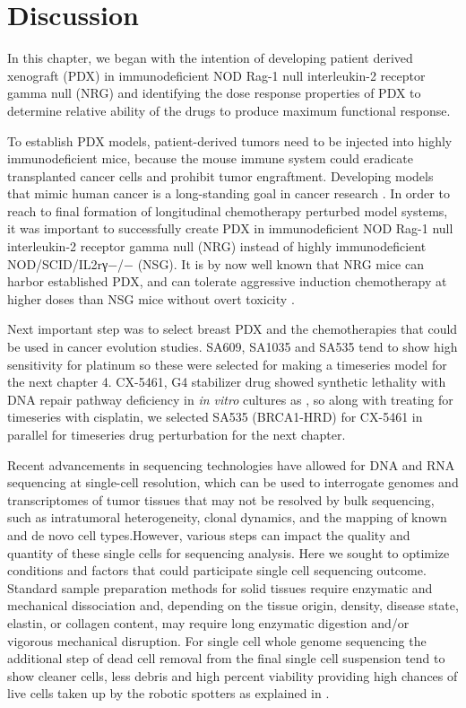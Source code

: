 \section{Discussion}
In this chapter, we began with the intention of developing patient derived xenograft (PDX) in immunodeficient NOD Rag-1 null interleukin-2 receptor gamma null (NRG) and identifying the dose response properties of PDX to determine relative ability of the drugs to produce maximum functional response.

To establish PDX models, patient-derived tumors need to be injected into highly immunodeficient mice, because the mouse immune system could eradicate transplanted cancer cells and prohibit tumor engraftment. Developing models that mimic human cancer is a long-standing goal in cancer research \cite{aparicio2015examining, may2018cancer, ryu2019integrative}. In order to reach to final formation of longitudinal chemotherapy perturbed model systems, it was important to successfully create PDX in immunodeficient NOD Rag-1 null interleukin-2 receptor gamma null (NRG) instead of highly immunodeficient NOD/SCID/IL2rγ−/− (NSG). It is by now well known that NRG mice can harbor established PDX, and can tolerate aggressive induction chemotherapy at higher doses than NSG mice without overt toxicity \cite{barve2018comparative}. 

Next important step was to select breast PDX and the chemotherapies that could be used in cancer evolution studies. SA609, SA1035 and SA535 tend to show high sensitivity for platinum so these were selected for making a timeseries model for the next chapter 4. CX-5461, G4 stabilizer drug showed synthetic lethality with DNA repair pathway deficiency in \textit{in vitro} cultures as \cite{xu2017cx}, so along with treating for timeseries with cisplatin, we selected SA535 (BRCA1-HRD) for CX-5461 in parallel for timeseries drug perturbation for the next chapter.

Recent advancements in sequencing technologies have allowed for DNA and RNA sequencing at single-cell resolution, which can be used to interrogate genomes and transcriptomes of tumor tissues that may not be resolved by bulk sequencing, such as intratumoral heterogeneity, clonal dynamics, and the mapping of known and de novo cell types.However, various steps can impact the quality and quantity of these single cells for sequencing analysis.
Here we sought to optimize conditions and factors that could participate single cell sequencing outcome. Standard sample preparation methods for solid tissues require enzymatic and mechanical dissociation and, depending on the tissue origin, density, disease state, elastin, or collagen content, may require long enzymatic digestion and/or vigorous mechanical disruption.
For single cell whole genome sequencing the additional step of dead cell removal from the final single cell suspension tend to show  cleaner cells, less debris and high percent viability providing high chances of live cells taken up by the robotic spotters as explained in \cite{laks2019clonal}. 

